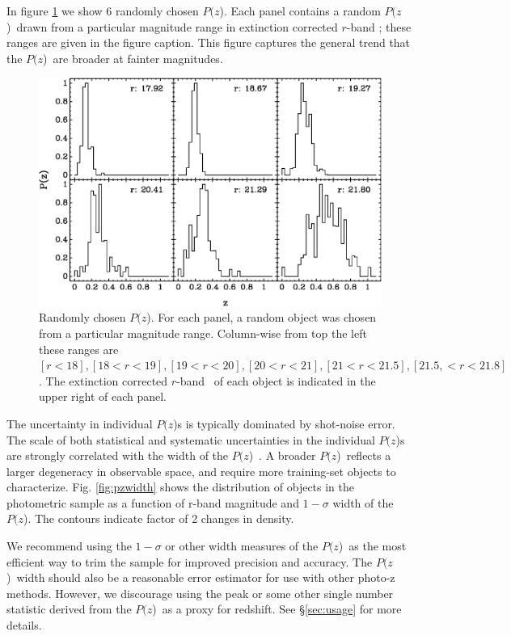 \documentclass[preprint]{aastex}
\newcommand{\pofz}{$P(z$)}
\begin{document}
In figure \ref{fig:rand6pofz} we show 6 randomly chosen \pofz.  Each panel
contains a random \pofz\ drawn from a particular magnitude range in extinction
corrected $r$-band \cmodelmag; these ranges are given in the figure caption.
This figure captures the general trend that the \pofz\ are broader at
fainter magnitudes.

\begin{figure} [t]\centering
    \includegraphics[scale=0.7]{figures/seed25-5-6pofz.eps}
    \caption{Randomly chosen \pofz.  For each panel, a random object was
    chosen from a particular magnitude range.  Column-wise from top the
    left these ranges are $[r < 18], [18 < r < 19], [19 < r < 20], 
    [20 < r < 21], [21 < r < 21.5], [21.5, < r < 21.8]$.  
    The extinction corrected $r$-band \cmodelmag\ of each object
    is indicated in the upper right of each panel.
    \label{fig:rand6pofz}}
\end{figure}

The uncertainty in individual \pofz s is typically dominated by shot-noise
error.  The scale of both statistical and systematic uncertainties in the
individual \pofz s are strongly correlated with the width of the \pofz\
\citep{CunhaPhotoz09}.  A broader \pofz\ reflects a larger degeneracy in
observable space, and require more training-set objects to characterize.  Fig.
\ref{fig:pzwidth} shows the distribution of objects in the photometric sample
as a function of r-band magnitude and $1-\sigma$ width of the \pofz.  The
contours indicate factor of 2 changes in density.  

We recommend using the $1-\sigma$ or other width measures of the \pofz\ as the
most efficient way to trim the sample for improved precision and accuracy.  The
\pofz\ width should also be a reasonable error estimator for use with other
photo-z methods.  However, we discourage using the peak or some other single
number statistic derived from the \pofz\ as a proxy for redshift. See 
\S \ref{sec:usage} for more details.

\end{document}
